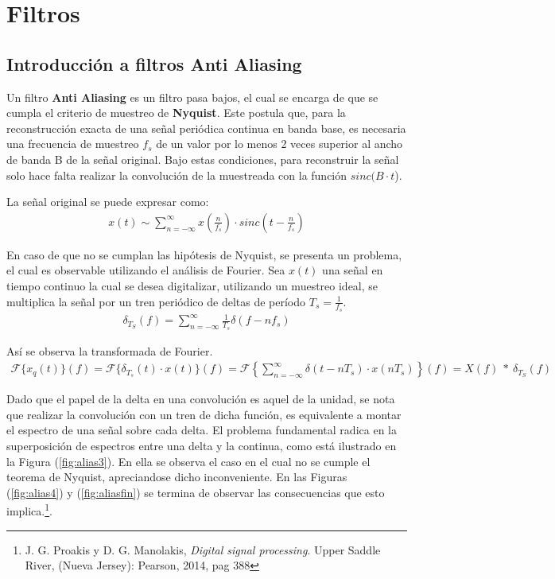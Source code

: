 


\section{Filtros}

\subsection{Introducción a filtros Anti Aliasing}
Un filtro \textbf{Anti Aliasing} es un filtro pasa bajos, el cual se encarga de que se cumpla el criterio de muestreo de \textbf{Nyquist}. Este postula que, para la reconstrucción exacta de una señal periódica continua en banda base, es necesaria una frecuencia de muestreo $f_s$ de un valor por lo menos 2 veces superior al ancho de banda B de la señal original. Bajo estas condiciones, para reconstruir la señal solo hace falta realizar la convolución de la muestreada con la función $sinc(B\cdot t$).

La señal original se puede expresar como:
\begin{align}
	x\left( t \right) \sim \sum_{n=-\infty}^{\infty} x\left( \frac{n}{f_s} \right) \cdot sinc \left( t-\frac{n}{f_s} \right)
\end{align}

En caso de que no se cumplan las hipótesis de Nyquist, se presenta un problema, el cual es observable utilizando el análisis de Fourier. Sea $x(t)$ una señal en tiempo continuo la cual se desea digitalizar, utilizando un muestreo ideal, se multiplica la señal por un tren periódico de deltas de período $T_s = \frac{1}{f_s}$.
\begin{align}
\delta_{T_S}(f)= \sum_{n=-\infty}^{\infty} \frac{1}{T_s} \delta(f-nf_s)
\end{align}

Así se observa la transformada de Fourier.
\begin{align}
	\mathcal{F} \{x_q(t) \} (f) =\mathcal{F} \{ \delta_{T_s} (t) \cdot x(t) \} (f)=\mathcal{F} \left\lbrace \sum_{n=-\infty}^{\infty} \delta(t-nT_s) \cdot x(nT_s)\right\rbrace (f)= X(f)\  *  \ \delta_{T_S}(f)
\end{align}

Dado que el papel de la delta en una convolución es aquel de la unidad, se nota que realizar la convolución con un tren de dicha función, es equivalente a montar el espectro de una señal sobre cada delta. El problema fundamental radica en la superposición de espectros entre una delta y la continua, como está ilustrado en la Figura (\ref{fig:alias3}). En ella se observa el caso en el cual no se cumple el teorema de Nyquist, apreciandose dicho inconveniente. En las Figuras (\ref{fig:alias4}) y (\ref{fig:aliasfin}) se termina de observar las consecuencias que esto implica.\footnote{J. G. Proakis y D. G. Manolakis, \textit{Digital signal processing}. Upper Saddle River, (Nueva Jersey): Pearson, 2014, pag 388}.

